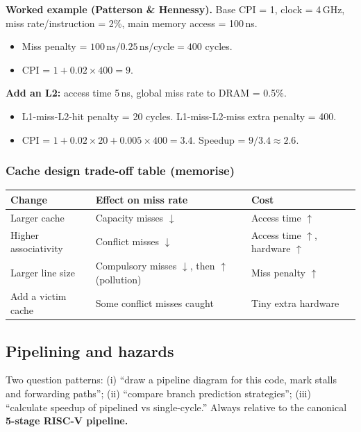 \documentclass[11pt,a4paper]{article}
\begin{document}
\textbf{Worked example (Patterson \& Hennessy).} Base CPI = 1, clock = 4\,GHz, miss rate/instruction = 2\%, main memory access = 100\,ns.
\begin{itemize}[leftmargin=*,itemsep=1pt]
  \item Miss penalty = $100\,\text{ns} / 0.25\,\text{ns/cycle} = 400$ cycles.
  \item CPI = $1 + 0.02 \times 400 = 9$.
\end{itemize}
\textbf{Add an L2:} access time 5\,ns, global miss rate to DRAM = 0.5\%.
\begin{itemize}[leftmargin=*,itemsep=1pt]
  \item L1-miss-L2-hit penalty = 20 cycles. L1-miss-L2-miss extra penalty = 400.
  \item CPI = $1 + 0.02 \times 20 + 0.005 \times 400 = 3.4$. Speedup = $9 / 3.4 \approx 2.6$.
\end{itemize}

\subsubsection*{Cache design trade-off table (memorise)}

\begin{center}
\begin{tabular}{p{4.5cm}p{4.5cm}p{5.5cm}}
\hline
\textbf{Change} & \textbf{Effect on miss rate} & \textbf{Cost} \\
\hline
Larger cache       & Capacity misses $\downarrow$    & Access time $\uparrow$ \\
Higher associativity & Conflict misses $\downarrow$  & Access time $\uparrow$, hardware $\uparrow$ \\
Larger line size   & Compulsory misses $\downarrow$, then $\uparrow$ (pollution) & Miss penalty $\uparrow$ \\
Add a victim cache & Some conflict misses caught     & Tiny extra hardware \\
\hline
\end{tabular}
\end{center}

\subsection{Pipelining and hazards}

\begin{must}
Two question patterns: (i) ``draw a pipeline diagram for this code, mark stalls and forwarding paths''; (ii) ``compare branch prediction strategies''; (iii) ``calculate speedup of pipelined vs single-cycle.'' Always relative to the canonical \textbf{5-stage RISC-V pipeline.}
\end{must}
\end{document}
